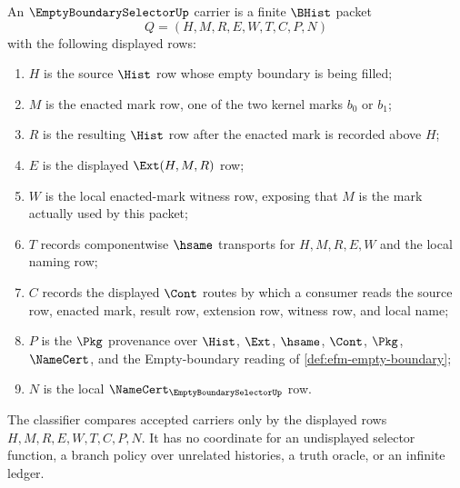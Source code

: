 \begin{definition}
\label{def:empty-boundary-selector-carrier}
An $\EmptyBoundarySelectorUp$ carrier is a finite $\BHist$ packet
$$
Q=(H,M,R,E,W,T,C,P,N)
$$
with the following displayed rows:
\begin{enumerate}
\item $H$ is the source $\Hist$ row whose empty boundary is being filled;
\item $M$ is the enacted mark row, one of the two kernel marks $b_0$ or $b_1$;
\item $R$ is the resulting $\Hist$ row after the enacted mark is recorded above $H$;
\item $E$ is the displayed $\Ext(H,M,R)$ row;
\item $W$ is the local enacted-mark witness row, exposing that $M$ is the mark actually used by this packet;
\item $T$ records componentwise $\hsame$ transports for $H,M,R,E,W$ and the local naming row;
\item $C$ records the displayed $\Cont$ routes by which a consumer reads the source row, enacted mark, result row, extension row, witness row, and local name;
\item $P$ is the $\Pkg$ provenance over $\Hist$, $\Ext$, $\hsame$, $\Cont$, $\Pkg$, $\NameCert$, and the Empty-boundary reading of \autoref{def:efm-empty-boundary};
\item $N$ is the local $\NameCert_{\EmptyBoundarySelectorUp}$ row.
\end{enumerate}
The classifier compares accepted carriers only by the displayed rows $H,M,R,E,W,T,C,P,N$. It has no coordinate for an undisplayed selector function, a branch policy over unrelated histories, a truth oracle, or an infinite ledger.
\end{definition}

